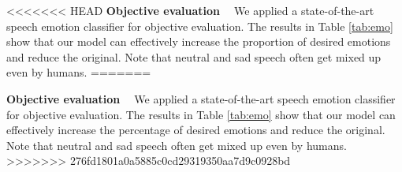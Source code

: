 \documentclass{article}
\begin{document}
<<<<<<< HEAD
\noindent \textbf{Objective evaluation \ } We applied a state-of-the-art speech emotion classifier \cite{mirsamadi2017automatic} for objective evaluation. The results in Table \ref{tab:emo} show that our model can effectively increase the proportion of desired emotions and reduce the original. Note that neutral and sad speech often get mixed up even by humans.
=======


\noindent \textbf{Objective evaluation \ } We applied a state-of-the-art speech emotion classifier \cite{mirsamadi2017automatic} for objective evaluation. The results in Table \ref{tab:emo} show that our model can effectively increase the percentage of desired emotions and reduce the original. Note that neutral and sad speech often get mixed up even by humans.
>>>>>>> 276fd1801a0a5885c0cd29319350aa7d9c0928bd
\end{document}
